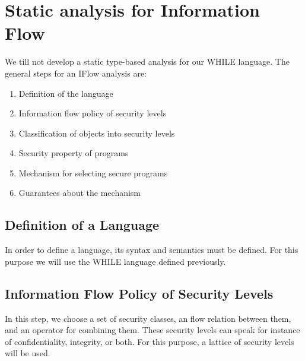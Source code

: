 \documentclass[10pt,a4paper]{report}
\begin{document}
\section{Static analysis for Information Flow}
We till not develop a static type-based analysis for our WHILE language. The general steps for an IFlow analysis are:
\begin{enumerate}
\item Definition of the language
\item Information flow policy of security levels
\item Classification of objects into security levels
\item Security property of programs
\item Mechanism for selecting secure programs
\item Guarantees about the mechanism
\end{enumerate}
\subsection{Definition of a Language}
In order to define a language, its syntax and semantics must be defined. For this purpose we will use the WHILE language defined previously.
\subsection{Information Flow Policy of Security Levels}
In this step, we choose a set of security classes, an flow relation between them, and an operator for combining them. These security levels can speak for instance of confidentiality, integrity, or both. For this purpose, a lattice of security levels will be used.
\end{document}
